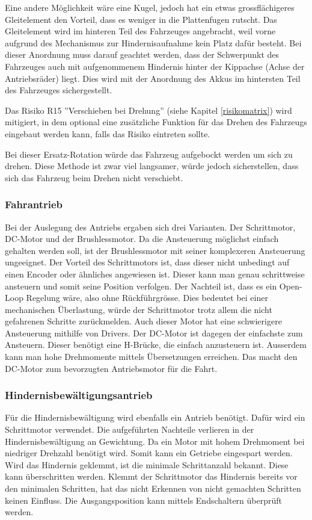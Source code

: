 \documentclass[../main.tex]{subfiles}
\begin{document}
Eine andere Möglichkeit wäre eine Kugel, jedoch hat ein etwas grossflächigeres Gleitelement den Vorteil, dass es weniger in die Plattenfugen rutscht. Das Gleitelement wird im hinteren Teil des Fahrzeuges angebracht, weil vorne aufgrund des Mechanismus zur Hindernisaufnahme kein Platz dafür besteht. Bei dieser Anordnung muss darauf geachtet werden, dass der Schwerpunkt des Fahrzeuges auch mit aufgenommenem Hindernis hinter der Kippachse (Achse der Antriebsräder) liegt. Dies wird mit der Anordnung des Akkus im hintersten Teil des Fahrzeuges sichergestellt.

Das Risiko R15 ''Verschieben bei Drehung'' (siehe Kapitel \ref{risikomatrix}) wird mitigiert,
in dem optional eine zusätzliche Funktion für das Drehen des Fahrzeugs eingebaut werden kann, falls das Risiko eintreten sollte.

Bei dieser Ersatz-Rotation würde das Fahrzeug aufgebockt werden um sich zu drehen.
Diese Methode ist zwar viel langsamer, würde jedoch sicherstellen, dass sich das Fahrzeug 
beim Drehen nicht verschiebt.

\subsubsection{Fahrantrieb}
\label{a3:Fahrantrieb}
Bei der Auslegung des Antriebs ergaben sich drei Varianten. Der Schrittmotor, DC-Motor und der Brushlessmotor. Da die Ansteuerung möglichst einfach gehalten werden soll, ist der Brushlessmotor mit seiner komplexeren Ansteuerung ungeeignet. Der Vorteil des Schrittmotors ist, dass dieser nicht unbedingt auf einen Encoder oder ähnliches angewiesen ist. Dieser kann man genau schrittweise ansteuern und somit seine Position verfolgen. Der Nachteil ist, dass es ein Open-Loop Regelung wäre, also ohne Rückführgrösse. Dies bedeutet bei einer mechanischen Überlastung, würde der Schrittmotor trotz allem die nicht gefahrenen Schritte zurückmelden. Auch dieser Motor hat eine schwierigere Ansteuerung mithilfe von Drivers. Der DC-Motor ist dagegen der einfachste zum Ansteuern. Dieser benötigt eine H-Brücke, die einfach anzusteuern ist. Ausserdem kann man hohe Drehmomente mittels Übersetzungen erreichen. Das macht den DC-Motor zum bevorzugten Antriebsmotor für die Fahrt.

\subsubsection{Hindernisbewältigungsantrieb}
\label{a3:Hindernisbewältigungsantrieb}
Für die Hindernisbewältigung wird ebenfalls ein Antrieb benötigt. Dafür wird ein Schrittmotor verwendet. Die aufgeführten Nachteile verlieren in der Hindernisbewältigung an Gewichtung. Da ein Motor mit hohem Drehmoment bei niedriger Drehzahl benötigt wird. Somit kann ein Getriebe eingespart werden. Wird das Hindernis geklemmt, ist die minimale Schrittanzahl bekannt. Diese kann überschritten werden. Klemmt der Schrittmotor das Hindernis bereits vor den minimalen Schritten, hat das nicht Erkennen von nicht gemachten Schritten keinen Einfluss. Die Ausgangsposition kann mittels Endschaltern überprüft werden.
  
\end{document}
